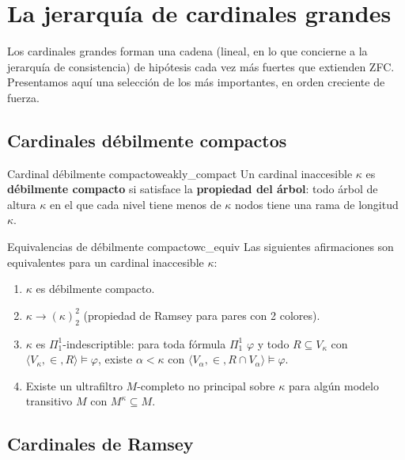 \section{La jerarquía de cardinales grandes}

Los cardinales grandes forman una cadena (lineal, en lo que concierne a la jerarquía de consistencia) de hipótesis cada vez más fuertes que extienden ZFC. Presentamos aquí una selección de los más importantes, en orden creciente de fuerza.

\subsection{Cardinales débilmente compactos}

\begin{definicion}{Cardinal débilmente compacto}{weakly_compact}
Un cardinal inaccesible $\kappa$ es \textbf{débilmente compacto} si satisface la \textbf{propiedad del árbol}: todo árbol de altura $\kappa$ en el que cada nivel tiene menos de $\kappa$ nodos tiene una rama de longitud $\kappa$.
\end{definicion}

\begin{observacion}{Equivalencias de débilmente compacto}{wc_equiv}
Las siguientes afirmaciones son equivalentes para un cardinal inaccesible $\kappa$:
\begin{enumerate}[leftmargin=2em, label=(\roman*)]
  \item $\kappa$ es débilmente compacto.
  \item $\kappa \to (\kappa)^2_2$ (propiedad de Ramsey para pares con 2 colores).
  \item $\kappa$ es $\Pi^1_1$-indescriptible: para toda fórmula $\Pi^1_1$ $\varphi$ y todo $R \subseteq V_\kappa$ con $\langle V_\kappa, \in, R \rangle \models \varphi$, existe $\alpha < \kappa$ con $\langle V_\alpha, \in, R \cap V_\alpha \rangle \models \varphi$.
  \item Existe un ultrafiltro $M$-completo no principal sobre $\kappa$ para algún modelo transitivo $M$ con $M^\kappa \subseteq M$.
\end{enumerate}
\end{observacion}

\subsection{Cardinales de Ramsey}

